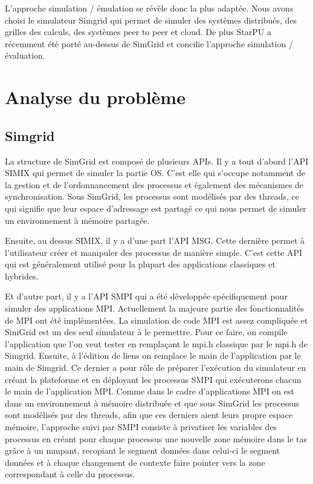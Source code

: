 \documentclass[smallextended]{svjour3}
\begin{document}
L'approche simulation / émulation se révèle donc la plus adaptée.
Nous avons choisi le simulateur Simgrid qui permet de simuler des
systèmes distribués, des grilles des calculs, des systèmes peer to
peer et cloud. De plus StarPU a récemment été porté au-dessus de
SimGrid et concilie l'approche simulation / évaluation.

\section{Analyse du problème}
\label{sec-3}
\subsection{Simgrid}
\label{sec-3-1}
La structure de SimGrid est composé de plusieurs APIs. Il y a tout
d'abord l'API SIMIX qui permet de simuler la partie OS. C'est elle
qui s'occupe notamment de la gestion et de l'ordonnancement des
processus et également des mécanismes de synchronisation. Sous
SimGrid, les processus sont modélisés par des threads, ce qui
signifie que leur espace d'adressage est partagé ce qui nous permet
de simuler un environnement à mémoire partagée. 

Ensuite, au dessus SIMIX, il y a d'une part l'API MSG. Cette dernière
permet à l'utilisateur créer et manipuler des processus de manière
simple. C'est cette API qui est généralement utilisé pour la
plupart des applications classiques et hybrides. 

Et d'autre part, il y a l'API SMPI qui a été développée
spécifiquement pour simuler des applications MPI. Actuellement la
majeure partie des fonctionnalités de MPI ont été implémentées. La
simulation de code MPI est assez compliquée et SimGrid est un des
seul simulateur à le permettre. Pour ce faire, on compile
l'application que l'on veut tester en remplaçant le mpi.h classique
par le mpi.h de Simgrid. Ensuite, à l'édition de liens on remplace
le main de l'application par le main de Simgrid. Ce dernier a pour
rôle de préparer l'exécution du simulateur en créant la plateforme
et en déployant les processus SMPI qui exécuterons chacun le main
de l'application MPI. Comme dans le cadre d'applications MPI on est
dans un environnement à mémoire distribuée et que sous SimGrid les
processus sont modélisés par des threads, afin que ces derniers
aient leurs propre espace mémoire, l'approche suivi par SMPI
consiste à privatiser les variables des processus en créant pour
chaque processus une nouvelle zone mémoire dans le tas grâce à un
mmpant, recopiant le segment données dans celui-ci le segment
données et à chaque changement de contexte faire pointer vers la
zone correspondant à celle du processus. 
\end{document}
